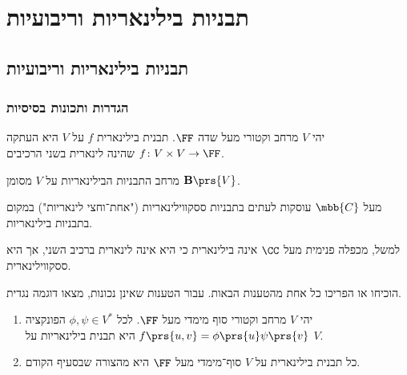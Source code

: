 \documentclass[a4paper,10pt,twoside,openany]{book}
\begin{document}
\part{תבניות בילינאריות וריבועיות}

\chapter{תבניות בילינאריות וריבועיות}

\section{הגדרות ותכונות בסיסיות}

\begin{definition}
יהי
$V$
מרחב וקטורי
מעל שדה $\FF$. תבנית בילינארית
$f$
על
$V$
היא העתקה
$f \colon V \times V \to \FF$
שהינה לינארית בשני הרכיבים.

מרחב התבניות הבילינאריות על
$V$
מסומן
$\mathbf{B}\prs{V}$.
\end{definition}

\begin{remark}
מעל
$\mbb{C}$
עוסקות לעתים בתבניות ססקווילינאריות ("אחת־וחצי לינאריות") במקום בתבניות בילינאריות.

למשל, מכפלה פנימית מעל
$\CC$
אינה בילינארית כי היא אינה לינארית ברכיב השני, אך היא ססקווילינארית.
\end{remark}

\begin{exercisechap}
הוכיחו או הפריכו כל אחת מהטענות הבאות. עבור הטענות שאינן נכונות, מצאו דוגמה נגדית.
\begin{enumerate}
\item
יהי
$V$
מרחב וקטורי סוף מימדי מעל
$\FF$.
לכל
$\phi, \psi \in V^*$
הפונקציה
$f\prs{u,v} = \phi\prs{u} \psi\prs{v}$
היא תבנית בילינאריות על
$V$.

\item כל תבנית בילינארית על
$V$
סוף־מימדי מעל
$\FF$
היא מהצורה שבסעיף הקודם.
\end{enumerate}
\end{exercisechap}
\end{document}

